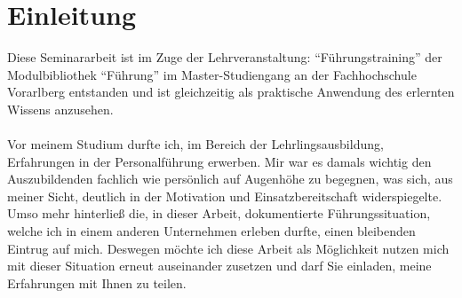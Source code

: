 \chapter{Einleitung}
\label{chap:einleitung}


Diese Seminararbeit ist im Zuge der Lehrveranstaltung: "`Führungstraining"' der Modulbibliothek "`Führung"' im Master-Studiengang an der Fachhochschule Vorarlberg entstanden und ist gleichzeitig als praktische Anwendung des erlernten Wissens anzusehen. \\
\\
Vor meinem Studium durfte ich, im Bereich der Lehrlingsausbildung, Erfahrungen in der Personalführung erwerben. 
Mir war es damals wichtig den Auszubildenden fachlich wie persönlich auf Augenhöhe zu begegnen, was sich, aus meiner Sicht, deutlich in der Motivation und Einsatzbereitschaft widerspiegelte.
Umso mehr hinterließ die, in dieser Arbeit, dokumentierte Führungssituation, welche ich in einem anderen Unternehmen erleben durfte, einen bleibenden Eintrug auf mich.  
Deswegen möchte ich diese Arbeit als Möglichkeit nutzen mich mit dieser Situation erneut auseinander zusetzen und darf Sie einladen, meine Erfahrungen mit Ihnen zu teilen.